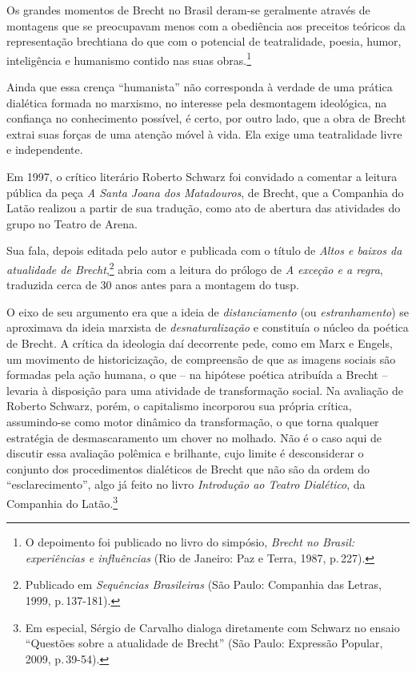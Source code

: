 \startblockquote
Os grandes momentos de Brecht no Brasil deram-se geralmente através de
montagens que se preocupavam menos com a obediência aos preceitos
teóricos da representação brechtiana do que com o potencial de
teatralidade, poesia, humor, inteligência e humanismo contido nas suas
obras.\footnote{O depoimento foi publicado no livro do simpósio,
  {\it Brecht no Brasil: experiências e influências} (Rio de Janeiro:
  Paz e Terra, 1987, p.\,227).}
\stopblockquote

Ainda que essa crença “humanista” não corresponda à verdade de uma
prática dialética formada no marxismo, no interesse pela desmontagem
ideológica, na confiança no conhecimento possível, é certo, por outro
lado, que a obra de Brecht extrai suas forças de uma atenção móvel à
vida. Ela exige uma teatralidade livre e independente.

Em 1997, o crítico literário Roberto Schwarz foi convidado a comentar a
leitura pública da peça {\it A Santa Joana dos Matadouros}, de Brecht,
que a Companhia do Latão realizou a partir de sua tradução, como ato de
abertura das atividades do grupo no Teatro de Arena.

Sua fala, depois editada pelo autor e publicada com o título de
{\it Altos e baixos da atualidade de Brecht},\footnote{Publicado em
  {\it Sequências Brasileiras} (São Paulo: Companhia das Letras, 1999,
  p.\,137-181).} abria com a leitura do prólogo de {\it A exceção e a
regra}, traduzida cerca de 30 anos antes para a montagem do {\sc tusp}.

O eixo de seu argumento era que a ideia de {\it distanciamento} (ou
{\it estranhamento}) se aproximava da ideia marxista de
{\it desnaturalização} e constituía o núcleo da poética de Brecht. A
crítica da ideologia daí decorrente pede, como em Marx e Engels, um
movimento de historicização, de compreensão de que as imagens sociais
são formadas pela ação humana, o que -- na hipótese poética atribuída a
Brecht -- levaria à disposição para uma atividade de transformação
social. Na avaliação de Roberto Schwarz, porém, o capitalismo incorporou
sua própria crítica, assumindo-se como motor dinâmico da transformação,
o que torna qualquer estratégia de desmascaramento um chover no molhado.
Não é o caso aqui de discutir essa avaliação polêmica e brilhante, cujo
limite é desconsiderar o conjunto dos procedimentos dialéticos de Brecht
que não são da ordem do “esclarecimento”, algo já feito no livro
{\it Introdução ao Teatro Dialético}, da Companhia do Latão.\footnote{Em
  especial, Sérgio de Carvalho dialoga diretamente com Schwarz no ensaio
  “Questões sobre a atualidade de Brecht” (São Paulo: Expressão Popular,
  2009, p.\,39-54).}

